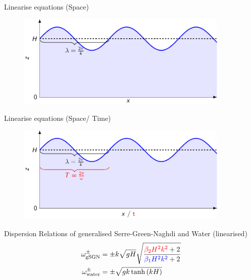 \documentclass[pdf]{beamer}
\begin{document}
    
    
\begin{frame}{Linearise equations (Space)}
\begin{figure}
	\centering
	\includegraphics[width=0.9\textwidth]{./Pics/Tex/Explanatory/DispersionPlot/Dispersion.pdf}
\end{figure}
\end{frame}

\begin{frame}{Linearise equations (Space/ {\color{red} Time})}
\begin{figure}
	\centering
	\includegraphics[width=0.9\textwidth]{./Pics/Tex/Explanatory/DispersionPlot/Dispersion_Analagous.pdf}
\end{figure}
\end{frame}

\begin{frame}{Dispersion Relations of generalised Serre-Green-Naghdi and Water (linearised)}
\begin{align*}
\omega^{\pm}_{\text{gSGN}} & =  \pm k \sqrt{gH} \sqrt{\dfrac{{\color{red}\beta_2 H^2 k^2} + 2}{ {\color{blue}\beta_1 H^2 k^2} + 2}} \\
\omega^{\pm}_{\text{water}} & = \pm \sqrt{gk \tanh\left(kH\right)}
\end{align*}
\end{frame}
\end{document}
